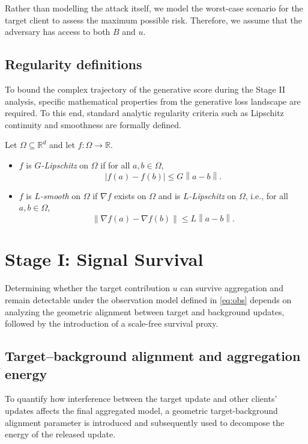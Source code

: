\documentclass[bdcc,article,submit,pdftex]{Definitions/mdpi}
\newcommand{\R}{\mathbb{R}}
\newcommand{\norm}[1]{\left\lVert #1 \right\rVert}
\newcommand{\utarget}{u}
\begin{document}
Rather than modelling the attack itself, we model the worst-case scenario for the target client to assess the maximum possible risk. Therefore, we assume that the adversary has access to both $B$ and $\utarget$.

\subsection{Regularity definitions}

To bound the complex trajectory of the generative score during the Stage II analysis, specific mathematical properties from the generative loss landscape are required. To this end, standard analytic regularity criteria such as Lipschitz continuity and smoothness are formally defined.

\begin{Definition}
\label{def:lipschitz_smooth}
Let $\Omega\subseteq\R^d$ and let $f:\Omega\to\R$.
\begin{itemize}[leftmargin=1.5em]
    \item $f$ is \emph{$G$-Lipschitz} on $\Omega$ if for all $a,b\in\Omega$,
    \[
    |f(a)-f(b)|\le G\norm{a-b}.
    \]
    \item $f$ is \emph{$L$-smooth} on $\Omega$ if $\nabla f$ exists on $\Omega$ and is \emph{$L$-Lipschitz} on $\Omega$, i.e., for all $a,b\in\Omega$,
    \[
    \norm{\nabla f(a)-\nabla f(b)}\le L\norm{a-b}.
    \]
\end{itemize}
\end{Definition}

\section{Stage I: Signal Survival}
\label{sec:stage1}

Determining whether the target contribution $\utarget$ can survive aggregation and remain detectable under the observation model defined in \eqref{eq:obs} depends on analyzing the geometric alignment between target and background updates, followed by the introduction of a scale-free survival proxy.

\subsection{Target--background alignment and aggregation energy}

To quantify how interference between the target update and other clients' updates affects the final aggregated model, a geometric target-background alignment parameter is introduced and subsequently used to decompose the energy of the released update.
\end{document}
